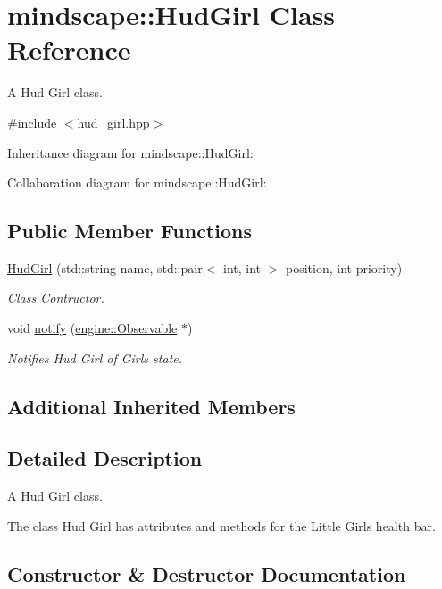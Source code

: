 \hypertarget{classmindscape_1_1_hud_girl}{}\section{mindscape\+:\+:Hud\+Girl Class Reference}
\label{classmindscape_1_1_hud_girl}


A Hud Girl class.  




{\ttfamily \#include $<$hud\+\_\+girl.\+hpp$>$}



Inheritance diagram for mindscape\+:\+:Hud\+Girl\+:


Collaboration diagram for mindscape\+:\+:Hud\+Girl\+:
\subsection*{Public Member Functions}
\begin{DoxyCompactItemize}
\item 
\hyperlink{classmindscape_1_1_hud_girl_a71122f6851e5be3bf3cd53647ba61ee4}{Hud\+Girl} (std\+::string name, std\+::pair$<$ int, int $>$ position, int priority)
\begin{DoxyCompactList}\small\item\em Class Contructor. \end{DoxyCompactList}\item 
void \hyperlink{classmindscape_1_1_hud_girl_aab26eccf3b4c726074174e34ffac817e}{notify} (\hyperlink{classengine_1_1_observable}{engine\+::\+Observable} $\ast$)
\begin{DoxyCompactList}\small\item\em Notifies Hud Girl of Girl\textquotesingle{}s state. \end{DoxyCompactList}\end{DoxyCompactItemize}
\subsection*{Additional Inherited Members}


\subsection{Detailed Description}
A Hud Girl class. 

The class Hud Girl has attributes and methods for the Little Girl\textquotesingle{}s health bar. 

\subsection{Constructor \& Destructor Documentation}
